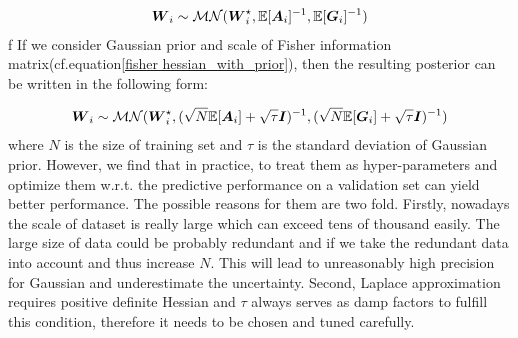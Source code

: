 \begin{equation}
\begin{aligned} \label{mvg}
\boldsymbol W_{i} \sim \mathcal{MN}(\boldsymbol W_i^\star, \mathbb E[\boldsymbol A_i]^{-1}, \mathbb E[\boldsymbol G_i]^{-1})
\end{aligned}
\end{equation}
f
If we consider Gaussian prior and scale of Fisher information matrix(cf.equation\ref{fisher hessian_with_prior}), then the resulting posterior can be written in the following form:

\begin{equation}
\begin{aligned} \label{mvg_priot}
\boldsymbol W_{i} \sim \mathcal{MN}(\boldsymbol W_i^\star, (\sqrt{N} \mathbb E[\boldsymbol A_i]+\sqrt{\tau}\boldsymbol I)^{-1}, (\sqrt{N}\mathbb E[\boldsymbol G_i]+\sqrt{\tau}\boldsymbol I)^{-1})
\end{aligned}
\end{equation} 
where $N$ is the size of training set and $\tau$ is the standard deviation of Gaussian prior.
However, we find that in practice, to treat them as hyper-parameters and optimize them w.r.t. the predictive performance on a validation set can yield better performance. The possible reasons for them are two fold. Firstly, nowadays the scale of dataset is really large which can exceed tens of thousand easily. The large size of data could be probably redundant and if we take the redundant data into account and thus increase $N$. This will lead to unreasonably high precision for Gaussian and underestimate the uncertainty. Second, Laplace approximation requires positive definite Hessian and $\tau$ always serves as damp factors to fulfill this condition, therefore it needs to be chosen and tuned carefully.    




